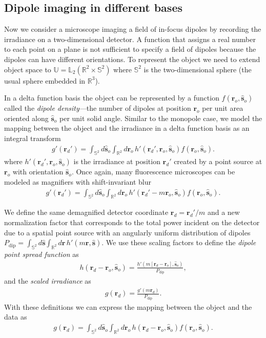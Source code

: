 \documentclass[]{osa-article}
\providecommand{\mb}[1]{\mathbf{#1}}
\providecommand{\ro}{\mathbf{\mathbf{r}}_o}
\providecommand{\so}{\mathbf{\hat{s}}_o}
\providecommand{\rd}{\mathbf{r}_d}
\providecommand{\mh}[1]{\mathbf{\hat{#1}}}
\providecommand{\mbb}[1]{\mathbb{#1}}
\begin{document}
\subsection{Dipole imaging in different bases}\label{sec:dipole}
Now we consider a microscope imaging a field of in-focus dipoles by recording
the irradiance on a two-dimensional detector. A function that assigns a real
number to each point on a plane is not sufficient to specify a field of dipoles
because the dipoles can have different orientations. To represent the object we
need to extend object space to $\mbb{U} = \mbb{L}_2(\mbb{R}^2\times\mbb{S}^2)$
where $\mbb{S}^2$ is the two-dimensional sphere (the usual sphere embedded in
$\mbb{R}^3$).

In a delta function basis the object can be represented by a function
$f(\ro, \so)$ called the \textit{dipole density}---the number of dipoles at
position $\ro{}$ per unit area oriented along $\so{}$ per unit solid angle.
Similar to the monopole case, we model the mapping between the object and the
irradiance in a delta function basis as an integral transform
\begin{align}
  g'(\rd') = \int_{\mbb{S}^2}d\so\int_{\mbb{R}^2}d\ro\, h'(\rd', \ro, \so)f(\ro, \so). 
\end{align}
where $h'(\rd', \ro, \so)$ is the irradiance at position $\rd'$ created by a
point source at $\ro$ with orientation $\so$. Once again, many fluorescence
microscopes can be modeled as magnifiers with shift-invariant blur
\begin{align}
  g'(\rd') = \int_{\mbb{S}^2}d\so\int_{\mbb{R}^2}d\ro\, h'(\rd' - m\ro, \so)f(\ro, \so). 
\end{align}

We define the same demagnified detector coordinate $\rd = \rd'/m$ and a new
normalization factor that corresponds to the total power incident on the
detector due to a spatial point source with an angularly uniform distribution of
dipoles
$P_\text{dip} = \int_{\mbb{S}^2}d\mh{s}\int_{\mbb{R}^2}d\mb{r}\, h'(m\mb{r},
\mh{s})$. We use these scaling factors to define the
\textit{dipole point spread function} as
\begin{align}
  h(\rd - \ro, \so) = \frac{h'(m[\rd - \ro], \so)}{P_\text{dip}}, 
\end{align}
and the \textit{scaled irradiance} as 
\begin{align}
  g(\rd) = \frac{g'(m\rd)}{P_\text{dip}}. 
\end{align}
With these definitions we can express the mapping between the object and the
data as
\begin{align}
g(\rd{}) = \int_{\mbb{S}^2}d\so{}\int_{\mbb{R}^2}d\ro{}\, h(\rd{} -\ro{}, \so{})f(\ro, \so). \label{eq:odpsf}
\end{align}
\end{document}
